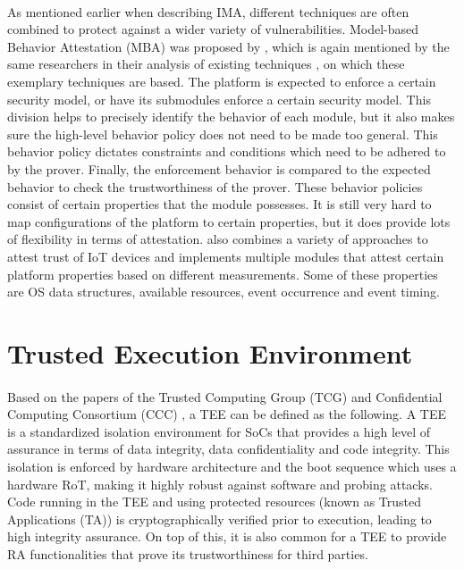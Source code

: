 \paragraph*{}
As mentioned earlier when describing IMA, different techniques are often combined to protect against a wider variety of vulnerabilities. Model-based Behavior Attestation (MBA) was proposed by \cite{AlamMasoom2008Mba}, which is again mentioned by the same researchers in their analysis of existing techniques \cite{AlamMasoom2012Aoer}, on which these exemplary techniques are based. The platform is expected to enforce a certain security model, or have its submodules enforce a certain security model. This division helps to precisely identify the behavior of each module, but it also makes sure the high-level behavior policy does not need to be made too general. This behavior policy dictates constraints and conditions which need to be adhered to by the prover. Finally, the enforcement behavior is compared to the expected behavior to check the trustworthiness of the prover. These behavior policies consist of certain properties that the module possesses. It is still very hard to map configurations of the platform to certain properties, but it does provide lots of flexibility in terms of attestation. \cite{MuhlbergJanTobias2016LaFT} also combines a variety of approaches to attest trust of IoT devices and implements multiple modules that attest certain platform properties based on different measurements. Some of these properties are OS data structures, available resources, event occurrence and event timing.  

\section{Trusted Execution Environment}

\paragraph*{}
Based on the papers of the Trusted Computing Group (TCG) \cite{TCG} and Confidential Computing Consortium (CCC) \cite{CCC}, a TEE can be defined as the following. A TEE is a standardized isolation environment for SoCs that provides a high level of assurance in terms of data integrity, data confidentiality and code integrity. This isolation is enforced by hardware architecture and the boot sequence which uses a hardware RoT, making it highly robust against software and probing attacks. Code running in the TEE and using protected resources (known as Trusted Applications (TA)) is cryptographically verified prior to execution, leading to high integrity assurance. On top of this, it is also common for a TEE to provide RA functionalities that prove its trustworthiness for third parties.

